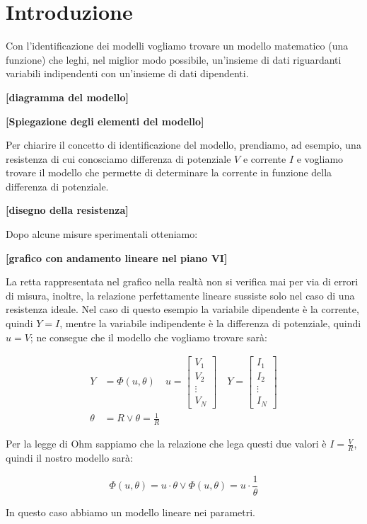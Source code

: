 \section{Introduzione}
Con l'identificazione dei modelli vogliamo trovare un modello matematico (una funzione) che leghi, nel miglior modo possibile, un'insieme di dati riguardanti variabili indipendenti con un'insieme di dati dipendenti.

\begin{center}
\textbf{[diagramma del modello]}
\end{center}

\begin{center}
\textbf{[Spiegazione degli elementi del modello]}
\end{center}

\begin{esempio} %
Per chiarire il concetto di identificazione del modello, prendiamo, ad esempio, una resistenza di cui conosciamo differenza di potenziale $V$ e corrente $I$ e vogliamo trovare il modello che permette di determinare la corrente in funzione della differenza di potenziale.
  \begin{center}
  \textbf{[disegno della resistenza]}
  \end{center}
Dopo alcune misure sperimentali otteniamo:
  \begin{center}
  \textbf{[grafico con andamento lineare nel piano VI]}
  \end{center}
La retta rappresentata nel grafico nella realtà non si verifica mai per via di errori di misura, inoltre, la relazione perfettamente lineare sussiste solo nel caso di una resistenza ideale.
Nel caso di questo esempio la variabile dipendente è la corrente, quindi $Y=I$, mentre la variabile indipendente è la differenza di potenziale, quindi $u=V$; ne consegue che il modello che vogliamo trovare sarà:

  \begin{align*}
    Y&=\Phi (u,\theta) \quad     u=\begin{bmatrix} V_1 \\ V_2 \\ \vdots \\ V_N\end{bmatrix} \quad  Y=\begin{bmatrix} I_1 \\ I_2 \\ \vdots \\ I_N \end{bmatrix}\\
    \theta&=R \vee \theta=\frac{1}{R}
  \end{align*}
  
Per la legge di Ohm sappiamo che la relazione che lega questi due valori è $I=\frac{V}{R}$, quindi il nostro modello sarà:

  \[ \Phi(u,\theta)=u \cdot \theta \vee \Phi(u,\theta)=u \cdot \frac{1}{\theta} \]
  
In questo caso abbiamo un modello lineare nei parametri.
\end{esempio}

